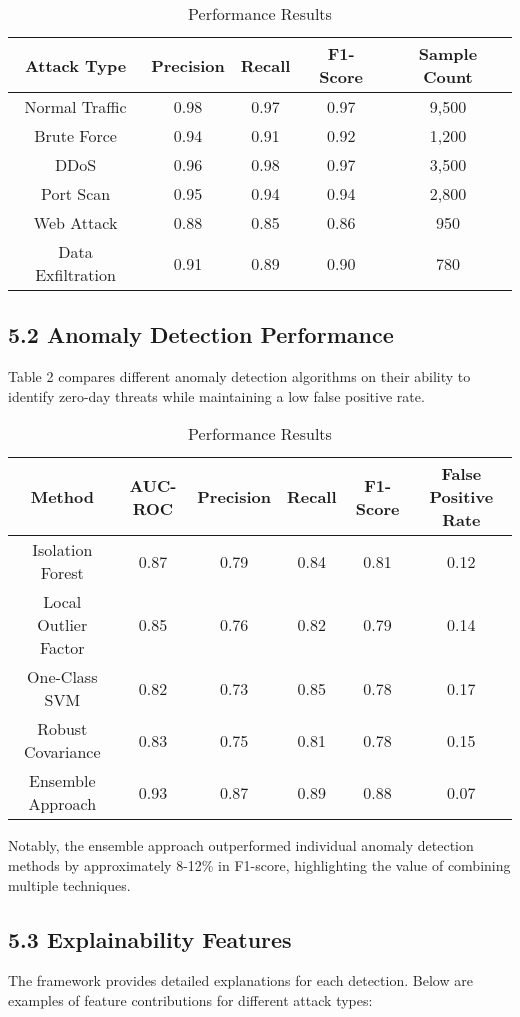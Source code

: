 \documentclass[12pt]{article}
\begin{document}
\begin{table}[H]
\centering
\begin{tabular}{|c|c|c|c|c|}
\hline
Attack Type & Precision & Recall & F1-Score & Sample Count \\
\hline
Normal Traffic & 0.98 & 0.97 & 0.97 & 9,500 \\
\hline
Brute Force & 0.94 & 0.91 & 0.92 & 1,200 \\
\hline
DDoS & 0.96 & 0.98 & 0.97 & 3,500 \\
\hline
Port Scan & 0.95 & 0.94 & 0.94 & 2,800 \\
\hline
Web Attack & 0.88 & 0.85 & 0.86 & 950 \\
\hline
Data Exfiltration & 0.91 & 0.89 & 0.90 & 780 \\
\hline
\end{tabular}
\caption{Performance Results}
\end{table}

\subsection{5.2 Anomaly Detection Performance}
Table 2 compares different anomaly detection algorithms on their ability to identify zero-day threats while maintaining a low false positive rate.

\begin{table}[H]
\centering
\begin{tabular}{|c|c|c|c|c|c|}
\hline
Method & AUC-ROC & Precision & Recall & F1-Score & False Positive Rate \\
\hline
Isolation Forest & 0.87 & 0.79 & 0.84 & 0.81 & 0.12 \\
\hline
Local Outlier Factor & 0.85 & 0.76 & 0.82 & 0.79 & 0.14 \\
\hline
One-Class SVM & 0.82 & 0.73 & 0.85 & 0.78 & 0.17 \\
\hline
Robust Covariance & 0.83 & 0.75 & 0.81 & 0.78 & 0.15 \\
\hline
Ensemble Approach & 0.93 & 0.87 & 0.89 & 0.88 & 0.07 \\
\hline
\end{tabular}
\caption{Performance Results}
\end{table}

Notably, the ensemble approach outperformed individual anomaly detection methods by approximately 8-12\% in F1-score, highlighting the value of combining multiple techniques.

\subsection{5.3 Explainability Features}
The framework provides detailed explanations for each detection. Below are examples of feature contributions for different attack types:
\end{document}
